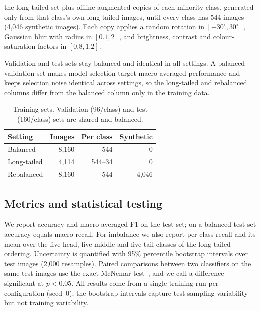  the long-tailed set plus offline augmented copies of each minority class, generated only from that class's own long-tailed images, until every class has 544 images (4{,}046 synthetic images).
Each copy applies a random rotation in $[-30^\circ, 30^\circ]$, Gaussian blur with radius in $[0.1, 2]$, and brightness, contrast and colour-saturation factors in $[0.8, 1.2]$.

Validation and test sets stay balanced and identical in all settings.
A balanced validation set makes model selection target macro-averaged performance and keeps selection noise identical across settings, so the long-tailed and rebalanced columns differ from the balanced column only in the training data.

\begin{table}[t]
  \centering
  \caption{Training sets. Validation (96/class) and test (160/class) sets are shared and balanced.}
  \label{tab:settings}
  \begin{tabular}{@{}lrrr@{}}
    \toprule
    Setting & Images & Per class & Synthetic \\
    \midrule
    Balanced    & 8{,}160 & 544      & 0 \\
    Long-tailed & 4{,}114 & 544--34  & 0 \\
    Rebalanced  & 8{,}160 & 544      & 4{,}046 \\
    \bottomrule
  \end{tabular}
\end{table}

\subsection{Metrics and statistical testing}
We report accuracy and macro-averaged F1 on the test set; on a balanced test set accuracy equals macro-recall.
For imbalance we also report per-class recall and its mean over the five head, five middle and five tail classes of the long-tailed ordering.
Uncertainty is quantified with 95\% percentile bootstrap intervals over test images (2{,}000 resamples).
Paired comparisons between two classifiers on the same test images use the exact McNemar test~\cite{dietterich1998tests}, and we call a difference significant at $p<0.05$.
All results come from a single training run per configuration (seed~0); the bootstrap intervals capture test-sampling variability but not training variability.
